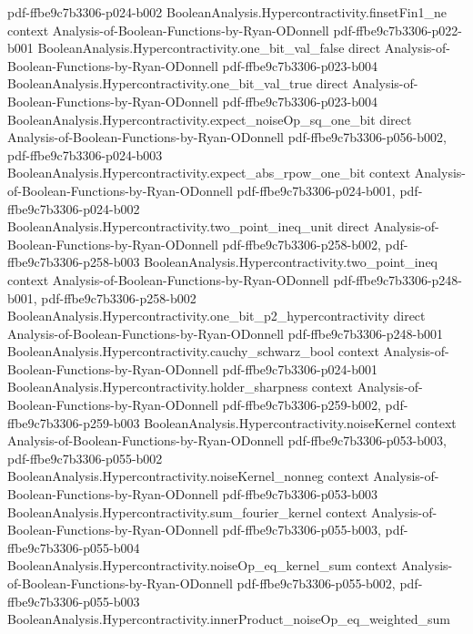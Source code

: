 \begin{lemma}
  {pdf-ffbe9c7b3306-p024-b002}
\proofstep
  {BooleanAnalysis.Hypercontractivity.finsetFin1_ne}
  {context}
  {Analysis-of-Boolean-Functions-by-Ryan-ODonnell}
  {pdf-ffbe9c7b3306-p022-b001}
\proofstep
  {BooleanAnalysis.Hypercontractivity.one_bit_val_false}
  {direct}
  {Analysis-of-Boolean-Functions-by-Ryan-ODonnell}
  {pdf-ffbe9c7b3306-p023-b004}
\proofstep
  {BooleanAnalysis.Hypercontractivity.one_bit_val_true}
  {direct}
  {Analysis-of-Boolean-Functions-by-Ryan-ODonnell}
  {pdf-ffbe9c7b3306-p023-b004}
\proofstep
  {BooleanAnalysis.Hypercontractivity.expect_noiseOp_sq_one_bit}
  {direct}
  {Analysis-of-Boolean-Functions-by-Ryan-ODonnell}
  {pdf-ffbe9c7b3306-p056-b002,
    pdf-ffbe9c7b3306-p024-b003}
\proofstep
  {BooleanAnalysis.Hypercontractivity.expect_abs_rpow_one_bit}
  {context}
  {Analysis-of-Boolean-Functions-by-Ryan-ODonnell}
  {pdf-ffbe9c7b3306-p024-b001,
    pdf-ffbe9c7b3306-p024-b002}
\proofstep
  {BooleanAnalysis.Hypercontractivity.two_point_ineq_unit}
  {direct}
  {Analysis-of-Boolean-Functions-by-Ryan-ODonnell}
  {pdf-ffbe9c7b3306-p258-b002,
    pdf-ffbe9c7b3306-p258-b003}
\proofstep
  {BooleanAnalysis.Hypercontractivity.two_point_ineq}
  {context}
  {Analysis-of-Boolean-Functions-by-Ryan-ODonnell}
  {pdf-ffbe9c7b3306-p248-b001,
    pdf-ffbe9c7b3306-p258-b002}
\proofstep
  {BooleanAnalysis.Hypercontractivity.one_bit_p2_hypercontractivity}
  {direct}
  {Analysis-of-Boolean-Functions-by-Ryan-ODonnell}
  {pdf-ffbe9c7b3306-p248-b001}
\proofstep
  {BooleanAnalysis.Hypercontractivity.cauchy_schwarz_bool}
  {context}
  {Analysis-of-Boolean-Functions-by-Ryan-ODonnell}
  {pdf-ffbe9c7b3306-p024-b001}
\proofstep
  {BooleanAnalysis.Hypercontractivity.holder_sharpness}
  {context}
  {Analysis-of-Boolean-Functions-by-Ryan-ODonnell}
  {pdf-ffbe9c7b3306-p259-b002,
    pdf-ffbe9c7b3306-p259-b003}
\proofstep
  {BooleanAnalysis.Hypercontractivity.noiseKernel}
  {context}
  {Analysis-of-Boolean-Functions-by-Ryan-ODonnell}
  {pdf-ffbe9c7b3306-p053-b003,
    pdf-ffbe9c7b3306-p055-b002}
\proofstep
  {BooleanAnalysis.Hypercontractivity.noiseKernel_nonneg}
  {context}
  {Analysis-of-Boolean-Functions-by-Ryan-ODonnell}
  {pdf-ffbe9c7b3306-p053-b003}
\proofstep
  {BooleanAnalysis.Hypercontractivity.sum_fourier_kernel}
  {context}
  {Analysis-of-Boolean-Functions-by-Ryan-ODonnell}
  {pdf-ffbe9c7b3306-p055-b003,
    pdf-ffbe9c7b3306-p055-b004}
\proofstep
  {BooleanAnalysis.Hypercontractivity.noiseOp_eq_kernel_sum}
  {context}
  {Analysis-of-Boolean-Functions-by-Ryan-ODonnell}
  {pdf-ffbe9c7b3306-p055-b002,
    pdf-ffbe9c7b3306-p055-b003}
\proofstep
  {BooleanAnalysis.Hypercontractivity.innerProduct_noiseOp_eq_weighted_sum}

\end{lemma}
